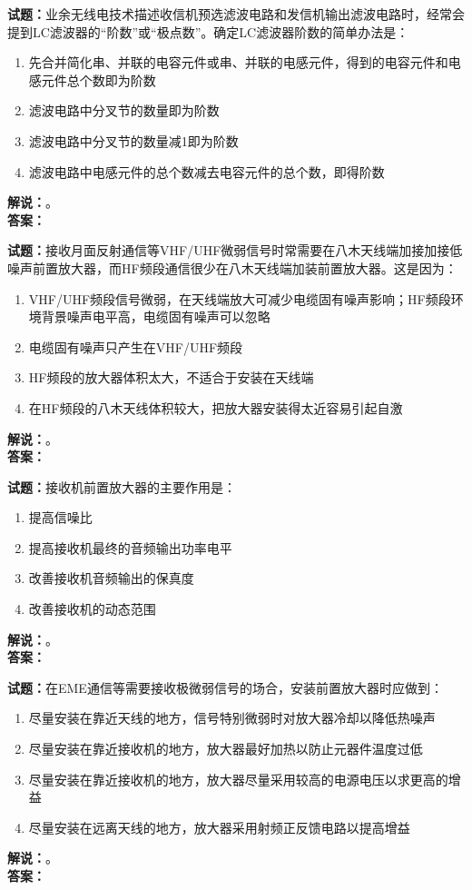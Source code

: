 \documentclass{ctexbook}
\begin{document}
\noindent\textbf{试题：}业余无线电技术描述收信机预选滤波电路和发信机输出滤波电路时，经常会提到LC滤波器的“阶数”或“极点数”。确定LC滤波器阶数的简单办法是：
\begin{enumerate}[leftmargin=3em]
  \item 先合并简化串、并联的电容元件或串、并联的电感元件，得到的电容元件和电感元件总个数即为阶数
  \item 滤波电路中分叉节的数量即为阶数
  \item 滤波电路中分叉节的数量减1即为阶数
  \item 滤波电路中电感元件的总个数减去电容元件的总个数，即得阶数
\end{enumerate}
\noindent\textbf{解说：}\textbf{}。\\\noindent\textbf{答案：}

\bigskip

\noindent\textbf{试题：}接收月面反射通信等VHF/UHF微弱信号时常需要在八木天线端加接加接低噪声前置放大器，而HF频段通信很少在八木天线端加装前置放大器。这是因为：
\begin{enumerate}[leftmargin=3em]
  \item VHF/UHF频段信号微弱，在天线端放大可减少电缆固有噪声影响；HF频段环境背景噪声电平高，电缆固有噪声可以忽略
  \item 电缆固有噪声只产生在VHF/UHF频段
  \item HF频段的放大器体积太大，不适合于安装在天线端
  \item 在HF频段的八木天线体积较大，把放大器安装得太近容易引起自激
\end{enumerate}
\noindent\textbf{解说：}\textbf{}。\\\noindent\textbf{答案：}

\bigskip

\noindent\textbf{试题：}接收机前置放大器的主要作用是：
\begin{enumerate}[leftmargin=3em]
  \item 提高信噪比
  \item 提高接收机最终的音频输出功率电平
  \item 改善接收机音频输出的保真度
  \item 改善接收机的动态范围
\end{enumerate}
\noindent\textbf{解说：}\textbf{}。\\\noindent\textbf{答案：}

\bigskip

\noindent\textbf{试题：}在EME通信等需要接收极微弱信号的场合，安装前置放大器时应做到：
\begin{enumerate}[leftmargin=3em]
  \item 尽量安装在靠近天线的地方，信号特别微弱时对放大器冷却以降低热噪声
  \item 尽量安装在靠近接收机的地方，放大器最好加热以防止元器件温度过低
  \item 尽量安装在靠近接收机的地方，放大器尽量采用较高的电源电压以求更高的增益
  \item 尽量安装在远离天线的地方，放大器采用射频正反馈电路以提高增益
\end{enumerate}
\noindent\textbf{解说：}\textbf{}。\\\noindent\textbf{答案：}
\end{document}
